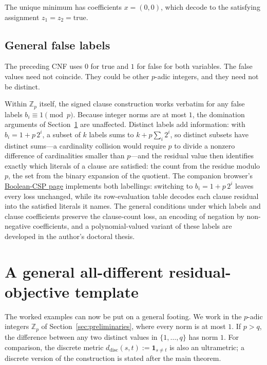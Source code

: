 \documentclass[11pt]{article}
\begin{document}
The unique minimum has coefficients \(x=(0,0)\), which decode to the satisfying assignment \(z_1=z_2=\mathrm{true}\).

\subsection{General false labels}
\label{sec:general-labels}

The preceding CNF uses \(0\) for true and \(1\) for false for both variables. The false values need not coincide. They could be other \(p\)-adic integers, and they need not be distinct.

Within \(\mathbb Z_p\) itself, the signed clause construction works verbatim for any false labels \(b_i\equiv 1\pmod p\). Because integer norms are at most \(1\), the domination arguments of Section~\ref{construction} are unaffected. Distinct labels add information: with \(b_i=1+p\,2^{i}\), a subset of \(k\) labels sums to \(k+p\sum_{i}2^{i}\), so distinct subsets have distinct sums---a cardinality collision would require \(p\) to divide a nonzero difference of cardinalities smaller than \(p\)---and the residual value then identifies exactly which literals of a clause are satisfied: the count from the residue modulo \(p\), the set from the binary expansion of the quotient. The companion browser's \href{https://padic-logic.symmachus.org/\#csp}{Boolean-CSP page} implements both labellings: switching to \(b_i=1+p\,2^{i}\) leaves every loss unchanged, while its row-evaluation table decodes each clause residual into the satisfied literals it names. The general conditions under which labels and clause coefficients preserve the clause-count loss, an encoding of negation by non-negative coefficients, and a polynomial-valued variant of these labels are developed in the author's doctoral thesis.

\section{A general all-different residual-objective template}
\label{construction}

The worked examples can now be put on a general footing.
We work in the $p$-adic integers $\mathbb Z_p$ of Section~\ref{sec:preliminaries}, where every norm is at most $1$. If $p>q$, the difference between any two distinct values in $\{1,\dots,q\}$ has norm $1$. For comparison, the discrete metric \(d_{\mathrm{disc}}(s,t):=\mathbf 1_{s\neq t}\) is also an ultrametric; a discrete version of the construction is stated after the main theorem.
\end{document}
